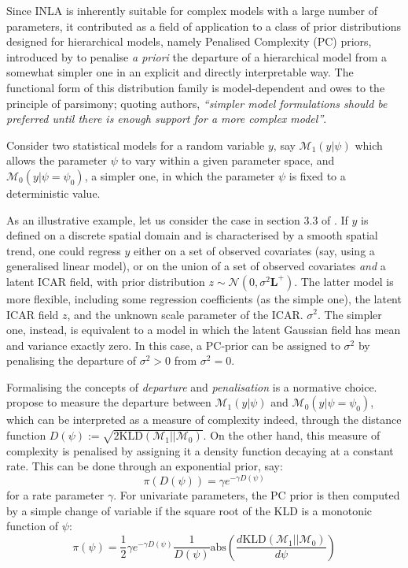 \documentclass[openany, 11pt, oneside]{book}
\begin{document}
Since INLA is inherently suitable for complex models with a large number of parameters, it contributed as a field of application to a class of prior distributions designed for hierarchical models, namely Penalised Complexity (PC) priors, introduced by \cite{PC} to penalise \textit{a priori} the departure of a hierarchical model from a somewhat simpler one in an explicit and directly interpretable way. The functional form of this distribution family is model-dependent and owes to the principle of parsimony; quoting authors, \textit{``simpler model formulations should be preferred until there is enough support for a more complex model''}.

Consider two statistical models for a random variable $y$, say $\mathcal{M}_1(y \vert \psi)$ which allows the parameter $\psi$ to vary within a given parameter space, and $\mathcal{M}_0(y\vert\psi=\psi_0)$, a simpler one, in which the parameter $\psi$ is fixed to a deterministic value. 

As an illustrative example, let us consider the case in section 3.3 of \cite{PC}. If $y$ is defined on a discrete spatial domain and is characterised by a smooth spatial trend, one could regress $y$ either on a set of observed covariates (say, using a generalised linear model), or on the union of a set of observed covariates \textit{and} a latent ICAR field, with prior distribution $z \sim \mathcal{N}\left(0, \sigma^2 \boldsymbol{L}^+\right)$. The latter model is more flexible, including some regression coefficients (as the simple one), the latent ICAR field $z$, and the unknown scale parameter of the ICAR. $\sigma^2$. The simpler one, instead, is equivalent to a model in which the latent Gaussian field has mean and variance exactly zero. In this case, a PC-prior can be assigned to $\sigma^2$ by penalising the departure of $\sigma^2 >0$ from $\sigma^2 =0$.

Formalising the concepts of \textit{departure} and \textit{penalisation} is a normative choice. \cite{PC} propose to measure the departure between $\mathcal{M}_1\left(y\vert \psi\right)$ and $\mathcal{M}_0\left( y \vert \psi=\psi_0 \right)$, which can be interpreted as a measure of complexity indeed, through the distance function $D(\psi):=\sqrt{2 \mathrm{KLD}\left( \mathcal{M}_1 \lvert \rvert \mathcal{M}_0\right)}$. On the other hand, this measure of complexity is penalised by assigning it a density function decaying at a constant rate. This can be done through an exponential prior, say: 
$$
\pi\left(D(\psi)\right) = \gamma e^{-\gamma D(\psi)}
$$
for a rate parameter $\gamma$. For univariate parameters, the PC prior is then computed by a simple change of variable if the square root of the KLD is a monotonic function of $\psi$:
\begin{equation}
\pi(\psi) =\frac{1}{2} \gamma e^{-\gamma D(\psi)}\frac{1}{D(\psi)} \mathrm{abs}\left(\frac{d \mathrm{KLD}\left( \mathcal{M}_1 \lvert \rvert \mathcal{M}_0\right)}{d \psi}\right)
\label{eq:PCprior}
\end{equation} 
\end{document}
